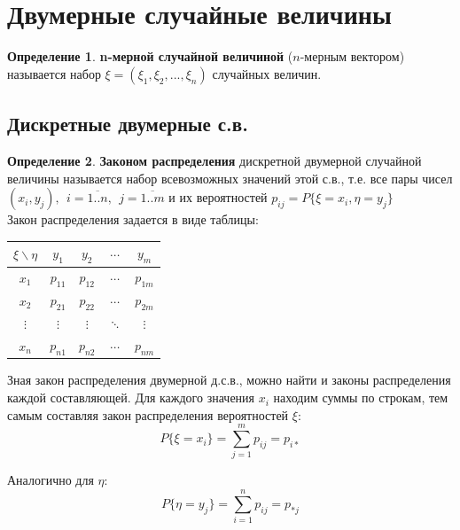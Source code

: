 \documentclass[12pt,a4paper]{article}
\theoremstyle{definition}
\newtheorem{definition}{Определение}[section]
\theoremstyle{definition}
\theoremstyle{remark}
\theoremstyle{corollary}
\theoremstyle{bolditalic}
\begin{document}
\newpage

\section{Двумерные случайные величины}

\begin{definition}
    \textbf{n-мерной случайной величиной} ($n$-мерным вектором) называется набор $\xi=(\xi_1, \xi_2, ..., \xi_n)$ случайных величин.
\end{definition}

\subsection{Дискретные двумерные с.в.}

\begin{definition}
    \textbf{Законом распределения} дискретной двумерной случайной величины называется набор всевозможных значений этой с.в., т.е. все пары чисел $(x_i, y_j),\ \ i=\overline{1..n},\ \ j=\overline{1..m}$ и их вероятностей $p_{ij}=P\{\xi=x_i, \eta=y_j\}$ \\

    Закон распределения задается в виде таблицы:

    \begin{table}[h!]
\centering
\renewcommand{\arraystretch}{1.2}
\begin{tabular}{|c|c|c|c|c|}
\hline
$\xi \backslash \eta$ & $y_1$ & $y_2$ & $\cdots$ & $y_m$ \\ 
\hline
$x_1$ & $p_{11}$ & $p_{12}$ & $\cdots$ & $p_{1m}$ \\ \hline
$x_2$ & $p_{21}$ & $p_{22}$ & $\cdots$ & $p_{2m}$ \\ \hline
$\vdots$ & $\vdots$ & $\vdots$ & $\ddots$ & $\vdots$ \\ \hline
$x_n$ & $p_{n1}$ & $p_{n2}$ & $\cdots$ & $p_{nm}$ \\ \hline
\end{tabular}
\end{table}

\end{definition}

Зная закон распределения двумерной д.с.в., можно найти и законы распределения каждой составляющей. Для каждого значения $x_i$ находим суммы по строкам, тем самым составляя закон распределения вероятностей $\xi$:
\[
P\{\xi=x_i\}=\sum_{j=1}^{m}{p_{ij}}=p_{i*}
\]

Аналогично для $\eta$:
\[
P\{\eta=y_j\}=\sum_{i=1}^{n}{p_{ij}}=p_{*j}
\]
\end{document}
